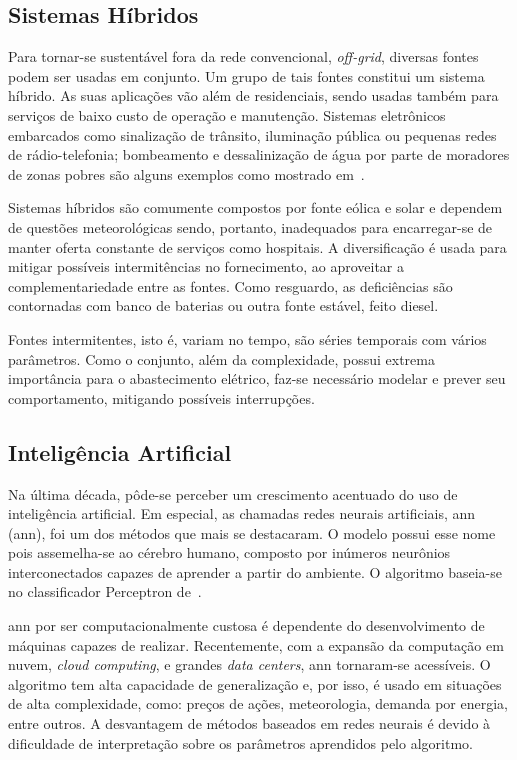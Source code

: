 \subsection{Sistemas Híbridos}

Para tornar-se sustentável fora da rede convencional, \emph{off-grid}, diversas
fontes podem ser usadas em conjunto. Um grupo de tais fontes constitui um
sistema híbrido. As suas aplicações vão além de residenciais, sendo usadas
também para serviços de baixo custo de operação e manutenção. Sistemas
eletrônicos embarcados como sinalização de trânsito, iluminação pública ou
pequenas redes de rádio-telefonia; bombeamento e dessalinização de água por
parte de moradores de zonas pobres são alguns exemplos como mostrado
em~\cite[cap. 1.4]{kaldellis_2010}.

Sistemas híbridos são comumente compostos por fonte eólica e solar e dependem de
questões meteorológicas sendo, portanto, inadequados para encarregar-se de
manter oferta constante de serviços como hospitais.  A diversificação é usada
para mitigar possíveis intermitências no fornecimento, ao aproveitar a
complementariedade entre as fontes.  Como resguardo, as deficiências são
contornadas com banco de baterias ou outra fonte estável, feito diesel.

Fontes intermitentes, isto é, variam no tempo, são séries temporais com vários
parâmetros.  Como o conjunto, além da complexidade, possui extrema importância para o
abastecimento elétrico, faz-se necessário modelar e prever seu comportamento,
mitigando possíveis interrupções.

\subsection{Inteligência Artificial}

Na última década, pôde-se perceber um crescimento acentuado do uso de
inteligência artificial. Em especial, as chamadas redes neurais artificiais,
\acrlong{ann} (\acrshort{ann}), foi um dos métodos que mais se
destacaram.  O modelo possui esse nome pois assemelha-se ao cérebro humano,
composto por inúmeros neurônios interconectados capazes de aprender a partir do
ambiente.  O algoritmo baseia-se no classificador Perceptron
de~\cite{rosenblatt1958perceptron}.

\acrshort{ann} por ser computacionalmente custosa é dependente do desenvolvimento de
máquinas capazes de realizar. Recentemente, com a expansão da computação em
nuvem, \emph{cloud computing}, e grandes \emph{data centers}, \acrshort{ann}
tornaram-se acessíveis.  O algoritmo tem alta capacidade de generalização e, por
isso, é usado em situações de alta complexidade, como: preços de ações,
meteorologia, demanda por energia, entre outros.
A desvantagem de métodos baseados em redes neurais é devido à dificuldade de
interpretação sobre os parâmetros aprendidos pelo algoritmo.

